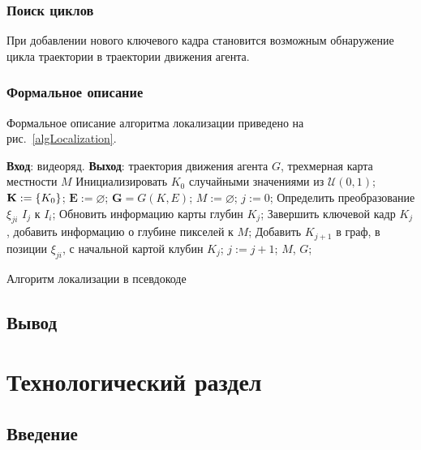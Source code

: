 \subsubsection{Поиск циклов}
При добавлении нового ключевого кадра становится возможным обнаружение цикла траектории в траектории движения агента.


\subsubsection{Формальное описание}
Формальное описание алгоритма локализации приведено на рис.~\ref{algLocalization}.
\begin{algorithm}[H]
        \begin{algorithmic}[1]
            \State \textbf{Вход}: видеоряд.
            \State \textbf{Выход}: траектория движения агента $G$, трехмерная карта местности $M$
            \State Инициализировать $K_0$ случайными значениями из $\mathcal{U}(0,1)$;
            \State $\mathbf{K} := \{ K_0 \}$; $\mathbf{E} := \varnothing$; $\mathbf{G} = G(K, E)$; $M := \varnothing$; $j := 0$;
                \State Определить преобразование $\xi_{ji}$ $I_j$ к $I_i$;
                    \State Обновить информацию карты глубин $K_j$;
                \Else
                    \State Завершить ключевой кадр $K_j$, добавить информацию о глубине пикселей к $M$;
                    \State Добавить $K_{j+1}$ в граф, в позиции $\xi_{ji}$, с начальной картой клубин $K_j$;
                    \State $j := j + 1$;
                \EndIf
            \EndFor
            \State \Return $M$, $G$;
        \end{algorithmic}
    \caption{Алгоритм локализации в псевдокоде}
    \label{algLocalization}
\end{algorithm}



\subsection{Вывод}



\section{Технологический раздел}
\subsection{Введение}
